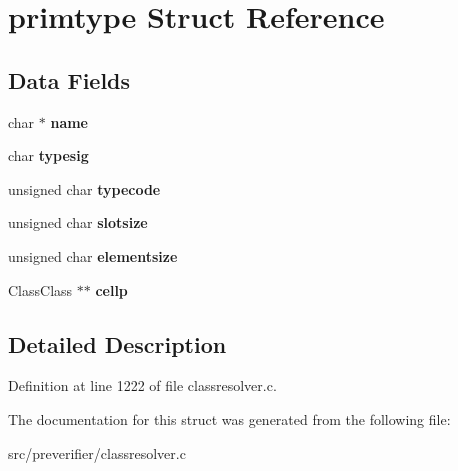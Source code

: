 \section{primtype Struct Reference}
\label{structprimtype}
\subsection*{Data Fields}
\begin{DoxyCompactItemize}
\item 
char $\ast$ {\bfseries name}\label{structprimtype_aec9c51f6bdf982334e1415d9e0f5a7b4}

\item 
char {\bfseries typesig}\label{structprimtype_a1522d39b92561007279fa99765a82327}

\item 
unsigned char {\bfseries typecode}\label{structprimtype_a802d43598032ab8f5986bbbf267c9ae7}

\item 
unsigned char {\bfseries slotsize}\label{structprimtype_a83a1184471a46781cde1e9c9b00d0e23}

\item 
unsigned char {\bfseries elementsize}\label{structprimtype_ad13a57e42832cd7ef69c97421dd88732}

\item 
ClassClass $\ast$$\ast$ {\bfseries cellp}\label{structprimtype_a87992fb0c24330a1919a9efdf24d3550}

\end{DoxyCompactItemize}


\subsection{Detailed Description}


Definition at line 1222 of file classresolver.c.



The documentation for this struct was generated from the following file:\begin{DoxyCompactItemize}
\item 
src/preverifier/classresolver.c\end{DoxyCompactItemize}

